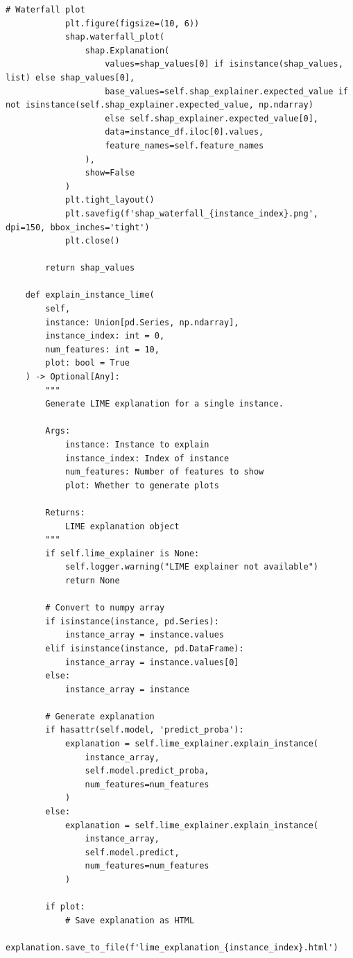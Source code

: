 \begin{lstlisting}[style=python, caption={Model Interpretability Framework with SHAP and LIME}]
            # Waterfall plot
            plt.figure(figsize=(10, 6))
            shap.waterfall_plot(
                shap.Explanation(
                    values=shap_values[0] if isinstance(shap_values, list) else shap_values[0],
                    base_values=self.shap_explainer.expected_value if not isinstance(self.shap_explainer.expected_value, np.ndarray)
                    else self.shap_explainer.expected_value[0],
                    data=instance_df.iloc[0].values,
                    feature_names=self.feature_names
                ),
                show=False
            )
            plt.tight_layout()
            plt.savefig(f'shap_waterfall_{instance_index}.png', dpi=150, bbox_inches='tight')
            plt.close()

        return shap_values

    def explain_instance_lime(
        self,
        instance: Union[pd.Series, np.ndarray],
        instance_index: int = 0,
        num_features: int = 10,
        plot: bool = True
    ) -> Optional[Any]:
        """
        Generate LIME explanation for a single instance.

        Args:
            instance: Instance to explain
            instance_index: Index of instance
            num_features: Number of features to show
            plot: Whether to generate plots

        Returns:
            LIME explanation object
        """
        if self.lime_explainer is None:
            self.logger.warning("LIME explainer not available")
            return None

        # Convert to numpy array
        if isinstance(instance, pd.Series):
            instance_array = instance.values
        elif isinstance(instance, pd.DataFrame):
            instance_array = instance.values[0]
        else:
            instance_array = instance

        # Generate explanation
        if hasattr(self.model, 'predict_proba'):
            explanation = self.lime_explainer.explain_instance(
                instance_array,
                self.model.predict_proba,
                num_features=num_features
            )
        else:
            explanation = self.lime_explainer.explain_instance(
                instance_array,
                self.model.predict,
                num_features=num_features
            )

        if plot:
            # Save explanation as HTML
            explanation.save_to_file(f'lime_explanation_{instance_index}.html')


\end{lstlisting}
